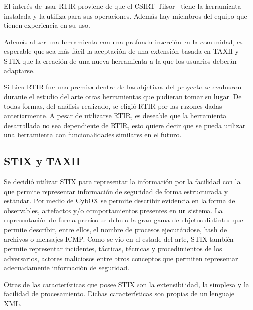 {
	El interés de usar RTIR proviene de que el CSIRT-Tilsor \ tiene la herramienta instalada y la utiliza para sus
	operaciones. Además hay miembros del equipo que tienen experiencia en su uso. }


\bigskip

{
	Además al ser una herramienta con una profunda inserción en la comunidad, es esperable que sea más fácil la aceptación
	de una extensión basada en TAXII y STIX que la creación de una nueva herramienta a la que los usuarios deberán
	adaptarse.}


\bigskip

{
	Si bien RTIR fue una premisa dentro de los objetivos del proyecto se evaluaron durante el estudio del arte otras
	herramientas que pudieran tomar su lugar. De todas formas, del análisis realizado, se eligió RTIR por las razones dadas
	anteriormente. A pesar de utilizarse RTIR, es deseable que la herramienta desarrollada no sea dependiente de RTIR, esto
	quiere decir que se pueda utilizar una herramienta con funcionalidades similares en el futuro.}

\subsection{STIX y TAXII}

\bigskip

{
	Se decidió utilizar STIX para representar la información por la facilidad con la que permite representar información de
	seguridad de forma estructurada y estándar. Por medio de CybOX se permite describir evidencia en la forma de
	observables, artefactos y/o comportamientos presentes en un sistema. La representación de forma precisa se debe a la
	gran gama de objetos distintos que permite describir, entre ellos, el nombre de procesos ejecutándose, hash de archivos
	o mensajes ICMP. Como se vio en el estado del arte, STIX también permite representar incidentes, tácticas, técnicas y
	procedimientos de los adversarios, actores maliciosos entre otros conceptos que permiten representar adecuadamente
	información de seguridad.}


\bigskip

{
	Otras de las características que posee STIX son la extensibilidad, la simpleza y la facilidad de procesamiento. Dichas
	características son propias de un lenguaje XML.}


\bigskip

